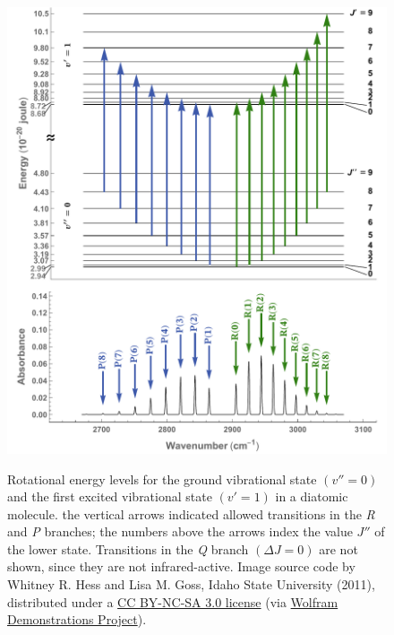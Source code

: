 \documentclass[nobib,nofonts,nols,nohyper]{tufte-handout}
\begin{document}
\begin{figure}[htb]
  \centering
	  \caption{Rotational energy levels for the ground vibrational state \( (v'' = 0) \) and the first excited vibrational state \( ( v' = 1) \) in a diatomic molecule. 
			the vertical arrows indicated allowed transitions in the \emph{R} and \emph{P} branches; the numbers above the arrows index the value \( J'' \) of the lower state. 
			Transitions in the \emph{Q} branch \( (\Delta J = 0) \) are not shown, since they are not infrared-active. 
			Image source code by Whitney R. Hess and Lisa M. Goss, Idaho State University (2011), distributed under a \href{http://creativecommons.org/licenses/by-nc-sa/3.0}{CC BY-NC-SA 3.0 license} 
			(via \href{http://demonstrations.wolfram.com/RotationVibrationEnergyLevelTransitionsOfADiatomicRotor/}{Wolfram Demonstrations Project}). 
		}
		\includegraphics[width=.9\textwidth]{images/rot_energy_levels.pdf}
		\label{fig:typ_spectrum}
\end{figure}
\end{document}
